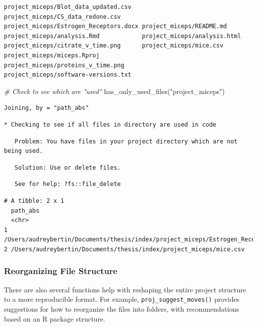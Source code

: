 \documentclass[12pt,twoside]{reedthesis}
\newenvironment{Shaded}{\begin{snugshade}}{\end{snugshade}}
\newcommand{\CommentTok}[1]{\textcolor[rgb]{0.56,0.35,0.01}{\textit{#1}}}
\newcommand{\FunctionTok}[1]{\textcolor[rgb]{0.00,0.00,0.00}{#1}}
\newcommand{\NormalTok}[1]{#1}
\newcommand{\StringTok}[1]{\textcolor[rgb]{0.31,0.60,0.02}{#1}}
\begin{document}
\begin{verbatim}
project_miceps/Blot_data_updated.csv   project_miceps/CS_data_redone.csv      
project_miceps/Estrogen_Receptors.docx project_miceps/README.md               
project_miceps/analysis.Rmd            project_miceps/analysis.html           
project_miceps/citrate_v_time.png      project_miceps/mice.csv                
project_miceps/miceps.Rproj            project_miceps/proteins_v_time.png     
project_miceps/software-versions.txt   
\end{verbatim}
\begin{Shaded}
\begin{Highlighting}[]
\CommentTok{\# Check to see which are "used"}
\FunctionTok{has\_only\_used\_files}\NormalTok{(}\StringTok{"project\_miceps"}\NormalTok{)}
\end{Highlighting}
\end{Shaded}
\begin{verbatim}
Joining, by = "path_abs"
\end{verbatim}
\begin{verbatim}
* Checking to see if all files in directory are used in code
\end{verbatim}
\begin{verbatim}
   Problem: You have files in your project directory which are not being used.
\end{verbatim}
\begin{verbatim}
   Solution: Use or delete files.
\end{verbatim}
\begin{verbatim}
   See for help: ?fs::file_delete
\end{verbatim}
\begin{verbatim}
# A tibble: 2 x 1
  path_abs                                                                      
  <chr>                                                                         
1 /Users/audreybertin/Documents/thesis/index/project_miceps/Estrogen_Receptors.~
2 /Users/audreybertin/Documents/thesis/index/project_miceps/mice.csv            
\end{verbatim}
\hypertarget{reorganizing-file-structure}{%
\subsubsection{Reorganizing File Structure}\label{reorganizing-file-structure}}

There are also several functions help with reshaping the entire project structure to a more reproducible format. For example, \texttt{proj\_suggest\_moves()} provides suggestions for how to reorganize the files into folders, with recommendations based on an R package structure.
\end{document}
